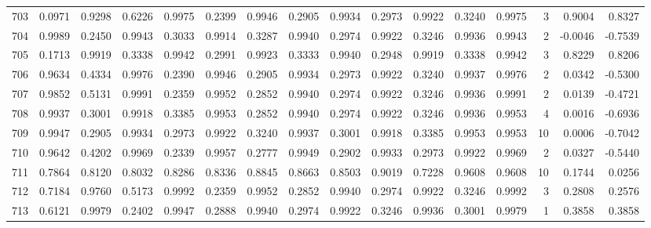 \begin{tabular}{lrrrrrrrrrrrrrrr}
703 &      0.0971 &  0.9298 &  0.6226 &  0.9975 &  0.2399 &  0.9946 &  0.2905 &  0.9934 &  0.2973 &  0.9922 &   0.3240 &     0.9975 &      3 &                    0.9004 &                     0.8327 \\
704 &      0.9989 &  0.2450 &  0.9943 &  0.3033 &  0.9914 &  0.3287 &  0.9940 &  0.2974 &  0.9922 &  0.3246 &   0.9936 &     0.9943 &      2 &                   -0.0046 &                    -0.7539 \\
705 &      0.1713 &  0.9919 &  0.3338 &  0.9942 &  0.2991 &  0.9923 &  0.3333 &  0.9940 &  0.2948 &  0.9919 &   0.3338 &     0.9942 &      3 &                    0.8229 &                     0.8206 \\
706 &      0.9634 &  0.4334 &  0.9976 &  0.2390 &  0.9946 &  0.2905 &  0.9934 &  0.2973 &  0.9922 &  0.3240 &   0.9937 &     0.9976 &      2 &                    0.0342 &                    -0.5300 \\
707 &      0.9852 &  0.5131 &  0.9991 &  0.2359 &  0.9952 &  0.2852 &  0.9940 &  0.2974 &  0.9922 &  0.3246 &   0.9936 &     0.9991 &      2 &                    0.0139 &                    -0.4721 \\
708 &      0.9937 &  0.3001 &  0.9918 &  0.3385 &  0.9953 &  0.2852 &  0.9940 &  0.2974 &  0.9922 &  0.3246 &   0.9936 &     0.9953 &      4 &                    0.0016 &                    -0.6936 \\
709 &      0.9947 &  0.2905 &  0.9934 &  0.2973 &  0.9922 &  0.3240 &  0.9937 &  0.3001 &  0.9918 &  0.3385 &   0.9953 &     0.9953 &     10 &                    0.0006 &                    -0.7042 \\
710 &      0.9642 &  0.4202 &  0.9969 &  0.2339 &  0.9957 &  0.2777 &  0.9949 &  0.2902 &  0.9933 &  0.2973 &   0.9922 &     0.9969 &      2 &                    0.0327 &                    -0.5440 \\
711 &      0.7864 &  0.8120 &  0.8032 &  0.8286 &  0.8336 &  0.8845 &  0.8663 &  0.8503 &  0.9019 &  0.7228 &   0.9608 &     0.9608 &     10 &                    0.1744 &                     0.0256 \\
712 &      0.7184 &  0.9760 &  0.5173 &  0.9992 &  0.2359 &  0.9952 &  0.2852 &  0.9940 &  0.2974 &  0.9922 &   0.3246 &     0.9992 &      3 &                    0.2808 &                     0.2576 \\
713 &      0.6121 &  0.9979 &  0.2402 &  0.9947 &  0.2888 &  0.9940 &  0.2974 &  0.9922 &  0.3246 &  0.9936 &   0.3001 &     0.9979 &      1 &                    0.3858 &                     0.3858 \\

\end{tabular}
